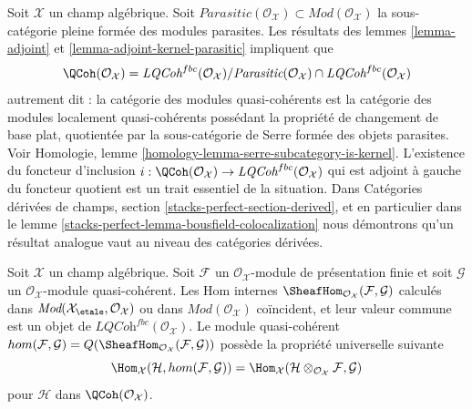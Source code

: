 \begin{remark}
\label{remark-bousfield-colocalization}
Soit $\mathcal{X}$ un champ algébrique. Soit
$\textit{Parasitic}(\mathcal{O}_\mathcal{X}) \subset
\textit{Mod}(\mathcal{O}_\mathcal{X})$ la
sous-catégorie pleine formée des modules parasites. Les résultats des
lemmes \ref{lemma-adjoint} et \ref{lemma-adjoint-kernel-parasitic}
impliquent que
$$
\QCoh(\mathcal{O}_\mathcal{X}) =
\textit{LQCoh}^{fbc}(\mathcal{O}_\mathcal{X}) /
\textit{Parasitic}(\mathcal{O}_\mathcal{X})
\cap \textit{LQCoh}^{fbc}(\mathcal{O}_\mathcal{X})
$$
autrement dit : la catégorie des modules quasi-cohérents est la catégorie
des modules localement quasi-cohérents possédant la propriété de changement de base plat,
quotientée par la sous-catégorie de Serre formée des objets parasites.
Voir Homologie, lemme \ref{homology-lemma-serre-subcategory-is-kernel}.
L'existence du foncteur d'inclusion
$i : \QCoh(\mathcal{O}_\mathcal{X}) \to
\textit{LQCoh}^{fbc}(\mathcal{O}_\mathcal{X})$
qui est adjoint à gauche du foncteur quotient est un trait essentiel de
la situation. Dans Catégories dérivées de champs, section
\ref{stacks-perfect-section-derived}, et en particulier dans le
lemme \ref{stacks-perfect-lemma-bousfield-colocalization}
nous démontrons qu'un résultat analogue vaut au niveau des catégories dérivées.
\end{remark}

\begin{lemma}
\label{lemma-internal-hom-fp-into-qcoh}
Soit $\mathcal{X}$ un champ algébrique. Soit $\mathcal{F}$ un
$\mathcal{O}_\mathcal{X}$-module de présentation finie et soit
$\mathcal{G}$ un $\mathcal{O}_\mathcal{X}$-module quasi-cohérent.
Les Hom internes
$\SheafHom_{\mathcal{O}_\mathcal{X}}(\mathcal{F}, \mathcal{G})$
calculés dans
$\textit{Mod}(\mathcal{X}_\etale, \mathcal{O}_\mathcal{X})$ ou dans
$\textit{Mod}(\mathcal{O}_\mathcal{X})$ coïncident, et leur valeur commune
est un objet de $\textit{LQCoh}^{fbc}(\mathcal{O}_\mathcal{X})$.
Le module quasi-cohérent
$
hom(\mathcal{F}, \mathcal{G}) =
Q(\SheafHom_{\mathcal{O}_\mathcal{X}}(\mathcal{F}, \mathcal{G}))
$
possède la propriété universelle suivante
$$
\Hom_\mathcal{X}(\mathcal{H}, hom(\mathcal{F}, \mathcal{G})) =
\Hom_\mathcal{X}(\mathcal{H} \otimes_{\mathcal{O}_\mathcal{X}} \mathcal{F},
\mathcal{G})
$$
pour $\mathcal{H}$ dans $\QCoh(\mathcal{O}_\mathcal{X})$.
\end{lemma}

